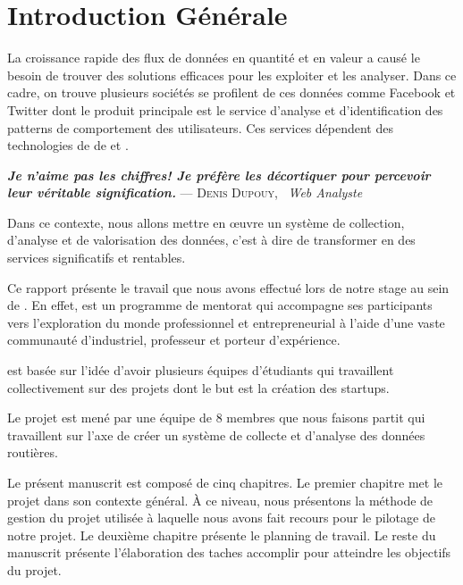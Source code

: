 \chapter*{Introduction Générale}

La croissance rapide des flux de données en quantité et en valeur a causé le
besoin de trouver des solutions efficaces pour les exploiter et les analyser.
Dans ce cadre, on trouve plusieurs sociétés se profilent de ces données comme
Facebook et Twitter dont le produit principale est le service d'analyse et
d'identification des patterns de comportement des utilisateurs. Ces services
dépendent des technologies de de  et .


\begin{center}
\textbf{\textit{Je n’aime pas les chiffres! Je préfère les décortiquer pour
percevoir leur véritable signification.}} \linebreak
\hfill --- \textsc{Denis Dupouy}, \ \textit{Web Analyste}
\end{center}

Dans ce contexte, nous allons mettre en \oe{}uvre un système de
collection, d'analyse et de valorisation des données, c'est à dire de transformer
en des services significatifs et rentables.

Ce rapport présente le travail que nous avons effectué lors de notre stage au
sein de . En effet,  est
un programme de mentorat qui accompagne ses participants vers l'exploration du monde
professionnel et entrepreneurial à l'aide d'une vaste communauté d'industriel,
professeur et porteur d'expérience.

 est basée sur l'idée d'avoir plusieurs équipes d'étudiants
qui travaillent collectivement sur des projets dont le but est la création des
startups.

Le projet  est mené par une équipe de 8 membres que nous faisons partit
qui travaillent sur l'axe de créer un système de collecte et d'analyse
des données routières.

Le présent manuscrit est composé de cinq chapitres. Le premier chapitre met le
projet dans son contexte général. À ce niveau, nous présentons la méthode de
gestion du projet utilisée à laquelle nous avons fait recours pour le pilotage
de notre projet. Le deuxième chapitre présente le planning de travail.
Le reste du manuscrit présente l'élaboration des taches
accomplir pour atteindre les objectifs du projet.
